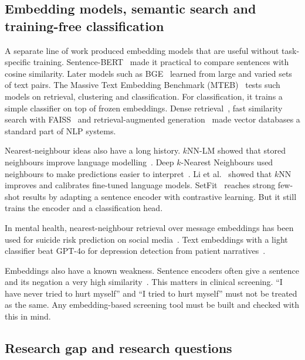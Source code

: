 \documentclass[11pt]{article}
\begin{document}
\subsection{Embedding models, semantic search and training-free classification}

A separate line of work produced embedding models that are useful without task-specific training.
Sentence-BERT~\cite{reimers2019sbert} made it practical to compare sentences with cosine similarity.
Later models such as BGE~\cite{xiao2023cpack} learned from large and varied sets of text pairs.
The Massive Text Embedding Benchmark (MTEB)~\cite{muennighoff2023mteb} tests such models on
retrieval, clustering and classification. For classification, it trains a simple classifier on top
of frozen embeddings. Dense retrieval~\cite{karpukhin2020dpr}, fast similarity search with
FAISS~\cite{johnson2019faiss} and retrieval-augmented generation~\cite{lewis2020rag} made vector
databases a standard part of NLP systems.

Nearest-neighbour ideas also have a long history. $k$NN-LM showed that stored neighbours improve
language modelling~\cite{khandelwal2020knnlm}. Deep $k$-Nearest Neighbours used neighbours to make
predictions easier to interpret~\cite{papernot2018dknn}. Li et al.~\cite{li2023revisitknn} showed
that $k$NN improves and calibrates fine-tuned language models. SetFit~\cite{tunstall2022setfit}
reaches strong few-shot results by adapting a sentence encoder with contrastive learning. But it
still trains the encoder and a classification head.

In mental health, nearest-neighbour retrieval over message embeddings has been used for suicide
risk prediction on social media~\cite{fabregat2022clpsych}. Text embeddings with a light classifier
beat GPT-4o for depression detection from patient narratives~\cite{lho2025jama}.

Embeddings also have a known weakness. Sentence encoders often give a sentence and its negation a
very high similarity~\cite{chiang2023heros,cao2025negation}. This matters in clinical screening.
``I have never tried to hurt myself'' and ``I tried to hurt myself'' must not be treated as the same.
Any embedding-based screening tool must be built and checked with this in mind.

\subsection{Research gap and research questions}
\end{document}

